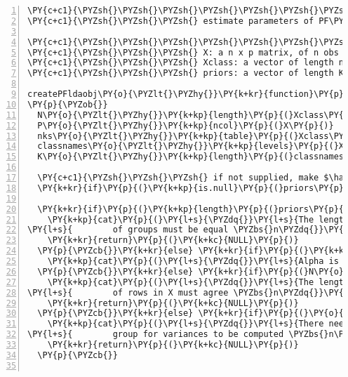 \begin{Verbatim}[commandchars=\\\{\},codes={\catcode`\$=3\catcode`\^=7\catcode`\_=8},gobble=0,numbers=left,fontfamily=fvm,fontshape=n,fontsize=\footnotesize,tabsize=2]
\PY{c+c1}{\PYZsh{}\PYZsh{}\PYZsh{}\PYZsh{}\PYZsh{}\PYZsh{}\PYZsh{} FUNCTION: createPFldaobj()}
\PY{c+c1}{\PYZsh{}\PYZsh{}\PYZsh{} estimate parameters of PF\PYZhy{}DA model, so that a discrim function created}

\PY{c+c1}{\PYZsh{}\PYZsh{}\PYZsh{}\PYZsh{}\PYZsh{}\PYZsh{}\PYZsh{} input:}
\PY{c+c1}{\PYZsh{}\PYZsh{}\PYZsh{} X: a n x p matrix, of n obs and p variables}
\PY{c+c1}{\PYZsh{}\PYZsh{}\PYZsh{} Xclass: a vector of length n of the classes (must be a factor variable)}
\PY{c+c1}{\PYZsh{}\PYZsh{}\PYZsh{} priors: a vector of length K (\PYZsh{}classes) with elements in (0,1)}

createPFldaobj\PY{o}{\PYZlt{}\PYZhy{}}\PY{k+kr}{function}\PY{p}{(}X\PY{p}{,}Xclass\PY{p}{,}lambdar\PY{o}{=}\PY{l+m}{1}\PY{p}{,}priors\PY{o}{=}\PY{k+kc}{NULL}\PY{p}{,}alph\PY{o}{=}\PY{k+kc}{NULL}\PY{p}{,}wts\PY{o}{=}\PY{k+kc}{NULL}\PY{p}{)}
\PY{p}{\PYZob{}}
  N\PY{o}{\PYZlt{}\PYZhy{}}\PY{k+kp}{length}\PY{p}{(}Xclass\PY{p}{)}
  P\PY{o}{\PYZlt{}\PYZhy{}}\PY{k+kp}{ncol}\PY{p}{(}X\PY{p}{)}
  nks\PY{o}{\PYZlt{}\PYZhy{}}\PY{k+kp}{table}\PY{p}{(}Xclass\PY{p}{)}
  classnames\PY{o}{\PYZlt{}\PYZhy{}}\PY{k+kp}{levels}\PY{p}{(}Xclass\PY{p}{)}
  K\PY{o}{\PYZlt{}\PYZhy{}}\PY{k+kp}{length}\PY{p}{(}classnames\PY{p}{)}
  
  \PY{c+c1}{\PYZsh{}\PYZsh{}\PYZsh{} if not supplied, make $\hat{\pi}_k$ data proportions}
  \PY{k+kr}{if}\PY{p}{(}\PY{k+kp}{is.null}\PY{p}{(}priors\PY{p}{)}\PY{p}{)} priors\PY{o}{\PYZlt{}\PYZhy{}}nks\PY{o}{/}N
  
  \PY{k+kr}{if}\PY{p}{(}\PY{k+kp}{length}\PY{p}{(}priors\PY{p}{)}\PY{o}{!=}K\PY{p}{)}\PY{p}{\PYZob{}}
    \PY{k+kp}{cat}\PY{p}{(}\PY{l+s}{\PYZdq{}}\PY{l+s}{The length of priors and the total number }
\PY{l+s}{        of groups must be equal \PYZbs{}n\PYZdq{}}\PY{p}{)}
    \PY{k+kr}{return}\PY{p}{(}\PY{k+kc}{NULL}\PY{p}{)}
  \PY{p}{\PYZcb{}}\PY{k+kr}{else} \PY{k+kr}{if}\PY{p}{(}\PY{k+kp}{is.null}\PY{p}{(}alph\PY{p}{)} \PY{o}{\PYZam{}} \PY{p}{(}N\PY{o}{\PYZlt{}}P\PY{p}{)}\PY{p}{)}\PY{p}{\PYZob{}}
    \PY{k+kp}{cat}\PY{p}{(}\PY{l+s}{\PYZdq{}}\PY{l+s}{Alpha is suggested for n\PYZlt{}p data \PYZbs{}n\PYZdq{}}\PY{p}{)}
  \PY{p}{\PYZcb{}}\PY{k+kr}{else} \PY{k+kr}{if}\PY{p}{(}N\PY{o}{!=}\PY{k+kp}{nrow}\PY{p}{(}X\PY{p}{)}\PY{p}{)}\PY{p}{\PYZob{}}
    \PY{k+kp}{cat}\PY{p}{(}\PY{l+s}{\PYZdq{}}\PY{l+s}{The length of Xclass and the number }
\PY{l+s}{        of rows in X must agree \PYZbs{}n\PYZdq{}}\PY{p}{)}
    \PY{k+kr}{return}\PY{p}{(}\PY{k+kc}{NULL}\PY{p}{)}
  \PY{p}{\PYZcb{}}\PY{k+kr}{else} \PY{k+kr}{if}\PY{p}{(}\PY{o}{!}\PY{k+kp}{all}\PY{p}{(}nks\PY{o}{\PYZgt{}}\PY{l+m}{1}\PY{p}{)}\PY{p}{)}\PY{p}{\PYZob{}}
    \PY{k+kp}{cat}\PY{p}{(}\PY{l+s}{\PYZdq{}}\PY{l+s}{There needs to be at least two obs in each }
\PY{l+s}{        group for variances to be computed \PYZbs{}n\PYZdq{}}\PY{p}{)}
    \PY{k+kr}{return}\PY{p}{(}\PY{k+kc}{NULL}\PY{p}{)}
  \PY{p}{\PYZcb{}}


\end{Verbatim}
